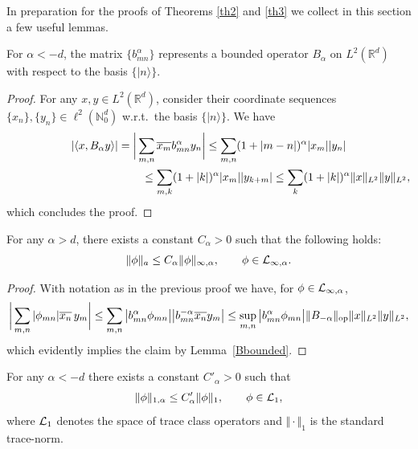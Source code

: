 \documentclass[pdftex]{sigma}
\begin{document}
In preparation for the proofs of Theorems \ref{th2} and \ref{th3} we
collect in this section a few useful lemmas.

\begin{lemma}
\label{Bbounded}
For $\alpha<-d$, the matrix
$\{b_{mn}^\alpha\}$ represents a bounded operator $B_\alpha$ on
$L^2(\mathbb R^d)$ with respect to the basis $\{|n\rangle\}$.
\end{lemma}
\begin{proof}
For any $x,y\in L^2(\mathbb R^d)$, consider their coordinate sequences
$\{x_n\},\{y_n\}\in \ell^2(\mathbb N_0^d)$ w.r.t.\ the basis $\{|n\rangle\}$. We have
\begin{gather*}
\vert\langle x,B_\alpha y\rangle\vert=
\bigg|\sum_{m,n}\overline{x_m} b^\alpha_{mn} y_n\bigg| \leq
\sum_{m,n}(1+|m-n|)^\alpha |x_m| |y_n|\\
\hphantom{\vert\langle x,B_\alpha y\rangle\vert=
\bigg|\sum_{m,n}\overline{x_m} b^\alpha_{mn} y_n\bigg|}{}
\leq\sum_{m,k}(1+|k|)^\alpha |x_m| |y_{k+m}|
\leq\sum_k(1+|k|)^\alpha \Vert x\Vert_{L^2} \Vert y\Vert_{L^2} ,
\end{gather*}
which concludes the proof.
\end{proof}

\begin{lemma}\label{anorm}
For any $\alpha>d$, there exists a constant $C_\alpha>0$ such that the following holds:
\[
\Vert\phi\Vert_a\leq C_\alpha \Vert\phi\Vert_{\infty,\alpha} ,\qquad \phi\in{\cal L}_{\infty,\alpha} .
\]
\end{lemma}

\begin{proof}
With notation as in the previous proof we have, for $\phi\in{\cal L}_{\infty,\alpha}$,
\begin{gather*}
\bigg|\sum_{m,n}|\phi_{mn}| \overline{x_n}\,y_m\bigg| \leq
\sum_{m,n}\big|b^\alpha_{mn} \phi_{mn}\big|
\big|b^{-\alpha}_{mn} \overline{x_n} y_m\big|
\leq \sup_{m,n}\big|b^\alpha_{mn}\phi_{mn}\big|
 \Vert B_{-\alpha}\Vert_{\rm op} \Vert x\Vert_{L^2} \Vert y\Vert_{L^2} ,
\end{gather*}
which evidently implies the claim by Lemma~\ref{Bbounded}.
\end{proof}

\begin{lemma}\label{trace}
For any $\alpha<-d$ there exists a constant $C'_\alpha>0$ such that
\[
\Vert\phi\Vert_{1,\alpha}\leq C'_{\alpha} \Vert\phi\Vert_1 ,\qquad \phi\in{\cal L}_1 ,
\]
where ${\cal L}_1$ denotes the space of trace class operators and
$\Vert\cdot\Vert_1$ is the standard trace-norm.
\end{lemma}
\end{document}
